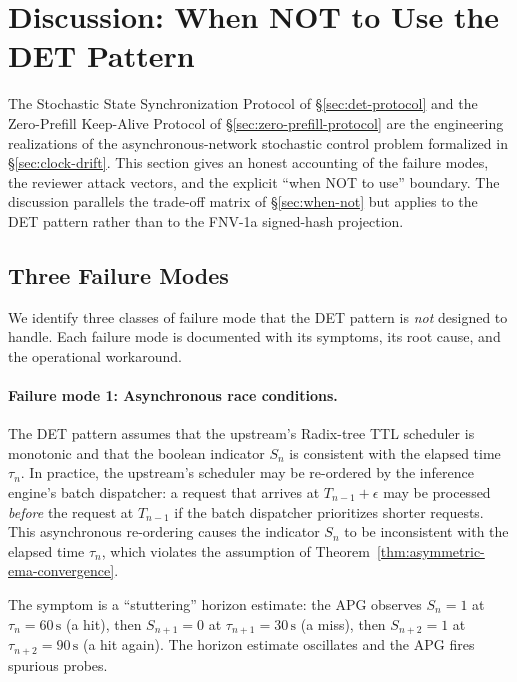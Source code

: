 \setcounter{section}{11}
\section{Discussion: When NOT to Use the DET Pattern}
\label{sec:when-not-det}

The Stochastic State Synchronization Protocol of \S\ref{sec:det-protocol}
and the Zero-Prefill Keep-Alive Protocol of
\S\ref{sec:zero-prefill-protocol} are the engineering realizations of
the asynchronous-network stochastic control problem formalized in
\S\ref{sec:clock-drift}. This section gives an honest accounting of
the failure modes, the reviewer attack vectors, and the explicit
``when NOT to use'' boundary. The discussion parallels the trade-off
matrix of \S\ref{sec:when-not} but applies to the DET pattern rather
than to the FNV-1a signed-hash projection.

\subsection{Three Failure Modes}

We identify three classes of failure mode that the DET pattern is
\emph{not} designed to handle. Each failure mode is documented with
its symptoms, its root cause, and the operational workaround.

\paragraph{Failure mode 1: Asynchronous race conditions.}
The DET pattern assumes that the upstream's Radix-tree TTL scheduler
is monotonic and that the boolean indicator $S_n$ is consistent with
the elapsed time $\tau_n$. In practice, the upstream's scheduler may
be re-ordered by the inference engine's batch dispatcher: a request
that arrives at $T_{n-1} + \epsilon$ may be processed \emph{before}
the request at $T_{n-1}$ if the batch dispatcher prioritizes
shorter requests. This asynchronous re-ordering causes the indicator
$S_n$ to be inconsistent with the elapsed time $\tau_n$, which
violates the assumption of
Theorem~\ref{thm:asymmetric-ema-convergence}.

The symptom is a ``stuttering'' horizon estimate: the APG observes
$S_n = 1$ at $\tau_n = 60\,\text{s}$ (a hit), then $S_{n+1} = 0$ at
$\tau_{n+1} = 30\,\text{s}$ (a miss), then $S_{n+2} = 1$ at $\tau_{n+2}
= 90\,\text{s}$ (a hit again). The horizon estimate oscillates and
the APG fires spurious probes.

